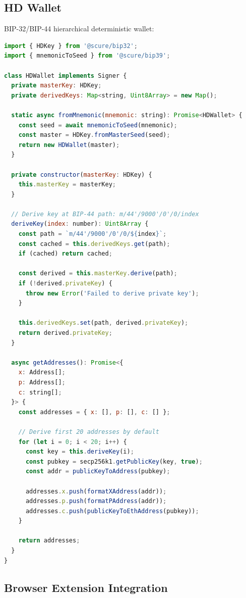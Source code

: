 \documentclass[11pt,twocolumn]{article}
\begin{document}
\subsection{HD Wallet}

BIP-32/BIP-44 hierarchical deterministic wallet:

\begin{lstlisting}[language=JavaScript,caption=HD Wallet]
import { HDKey } from '@scure/bip32';
import { mnemonicToSeed } from '@scure/bip39';

class HDWallet implements Signer {
  private masterKey: HDKey;
  private derivedKeys: Map<string, Uint8Array> = new Map();

  static async fromMnemonic(mnemonic: string): Promise<HDWallet> {
    const seed = await mnemonicToSeed(mnemonic);
    const master = HDKey.fromMasterSeed(seed);
    return new HDWallet(master);
  }

  private constructor(masterKey: HDKey) {
    this.masterKey = masterKey;
  }

  // Derive key at BIP-44 path: m/44'/9000'/0'/0/index
  deriveKey(index: number): Uint8Array {
    const path = `m/44'/9000'/0'/0/${index}`;
    const cached = this.derivedKeys.get(path);
    if (cached) return cached;

    const derived = this.masterKey.derive(path);
    if (!derived.privateKey) {
      throw new Error('Failed to derive private key');
    }

    this.derivedKeys.set(path, derived.privateKey);
    return derived.privateKey;
  }

  async getAddresses(): Promise<{
    x: Address[];
    p: Address[];
    c: string[];
  }> {
    const addresses = { x: [], p: [], c: [] };

    // Derive first 20 addresses by default
    for (let i = 0; i < 20; i++) {
      const key = this.deriveKey(i);
      const pubkey = secp256k1.getPublicKey(key, true);
      const addr = publicKeyToAddress(pubkey);

      addresses.x.push(formatXAddress(addr));
      addresses.p.push(formatPAddress(addr));
      addresses.c.push(publicKeyToEthAddress(pubkey));
    }

    return addresses;
  }
}
\end{lstlisting}

\subsection{Browser Extension Integration}
\end{document}
